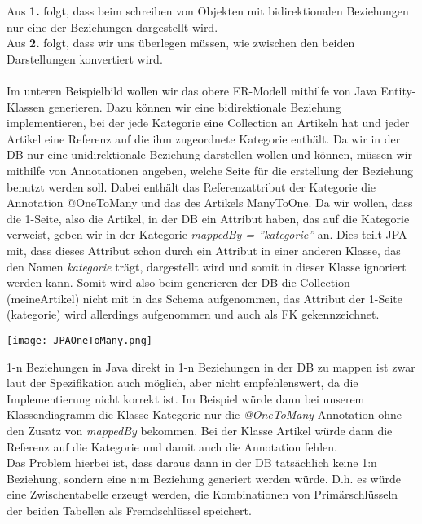 Aus \textbf{1.} folgt, dass beim schreiben von Objekten mit bidirektionalen Beziehungen nur eine der Beziehungen dargestellt wird.\\
Aus \textbf{2.} folgt, dass wir uns überlegen müssen, wie zwischen den beiden Darstellungen konvertiert wird.\\
\\
Im unteren Beispielbild wollen wir das obere ER-Modell mithilfe von Java Entity-Klassen generieren. Dazu können wir eine bidirektionale Beziehung implementieren, bei der jede Kategorie eine Collection an Artikeln hat und jeder Artikel eine Referenz auf die ihm zugeordnete Kategorie enthält. Da wir in der DB nur eine unidirektionale Beziehung darstellen wollen und können, müssen wir mithilfe von Annotationen angeben, welche Seite für die erstellung der Beziehung benutzt werden soll. Dabei enthält das Referenzattribut der Kategorie die Annotation @OneToMany und das des Artikels ManyToOne. Da wir wollen, dass die 1-Seite, also die Artikel, in der DB ein Attribut haben, das auf die Kategorie verweist, geben wir in der Kategorie \textit{mappedBy = ''kategorie''} an. Dies teilt JPA mit, dass dieses Attribut schon durch ein Attribut in einer anderen Klasse, das den Namen \textit{kategorie} trägt, dargestellt wird und somit in dieser Klasse ignoriert werden kann. Somit wird also beim generieren der DB die Collection (meineArtikel) nicht mit in das Schema aufgenommen, das Attribut der 1-Seite (kategorie) wird allerdings aufgenommen und auch als FK gekennzeichnet.


\texttt{[image: JPAOneToMany.png]}

1-n Beziehungen in Java direkt in 1-n Beziehungen in der DB zu mappen ist zwar laut der Spezifikation auch möglich, aber nicht empfehlenswert, da die Implementierung nicht korrekt ist. Im Beispiel würde dann bei unserem Klassendiagramm die Klasse Kategorie nur die \textit{@OneToMany} Annotation ohne den Zusatz von \textit{mappedBy} bekommen. Bei der Klasse Artikel würde dann die Referenz auf die Kategorie und damit auch die Annotation fehlen.\\
Das Problem hierbei ist, dass daraus dann in der DB tatsächlich keine 1:n Beziehung, sondern eine n:m Beziehung generiert werden würde. D.h. es würde eine Zwischentabelle erzeugt werden, die Kombinationen von Primärschlüsseln der beiden Tabellen als Fremdschlüssel speichert.


